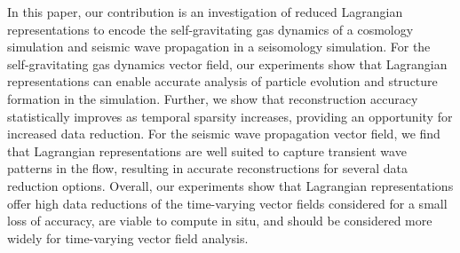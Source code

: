%
%
%
%
%

In this paper, our contribution is an investigation of reduced Lagrangian representations to encode the self-gravitating gas dynamics of a cosmology simulation and seismic wave propagation in a seisomology simulation.
%
For the self-gravitating gas dynamics vector field, our experiments show that Lagrangian representations can enable accurate analysis of particle evolution and structure formation in the simulation.
%
Further, we show that reconstruction accuracy statistically improves as temporal sparsity increases, providing an opportunity for increased data reduction.
%
For the seismic wave propagation vector field, we find that Lagrangian representations are well suited to capture transient wave patterns in the flow, resulting in accurate reconstructions for several data reduction options.
%
Overall, our experiments show that Lagrangian representations offer high data reductions of the time-varying vector fields considered for a small loss of accuracy, are viable to compute in situ, and should be considered more widely for time-varying vector field analysis.  
%
%
%
%
%
